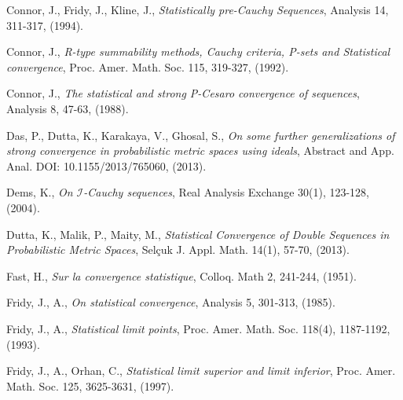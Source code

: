 \documentclass[reqno,b5paper]{amsart}
\theoremstyle{plain}
\theoremstyle{definition}
\begin{document}
\begin{thebibliography}{99}

 Connor, J., Fridy, J., Kline, J., \textit{Statistically pre-Cauchy Sequences}, Analysis 14, 311-317, (1994).

 Connor, J., \textit{R-type summability methods, Cauchy criteria, P-sets and Statistical
convergence}, Proc. Amer. Math. Soc. 115, 319-327, (1992).

 Connor, J., \textit{The statistical and strong P-Cesaro convergence of sequences}, Analysis 8, 47-63, (1988).


 Das, P., Dutta, K., Karakaya, V., Ghosal, S., \textit{On some further generalizations of strong convergence in probabilistic metric spaces using ideals}, Abstract and App. Anal. DOI: 10.1155/2013/765060, (2013).


 Dems, K., \textit{On $\mathcal{I}$-Cauchy sequences}, Real Analysis Exchange 30(1), 123-128, (2004).

 Dutta, K., Malik, P., Maity, M., \textit{Statistical Convergence of Double Sequences in Probabilistic Metric Spaces}, Sel\c{c}uk J. Appl. Math. 14(1), 57-70, (2013).


 Fast, H., \textit{Sur la convergence statistique}, Colloq. Math 2, 241-244, (1951).

 Fridy, J., A., \textit{On statistical convergence}, Analysis  5, 301-313, (1985).

 Fridy, J., A., \textit{Statistical limit points}, Proc. Amer. Math. Soc. 118(4), 1187-1192, (1993).

 Fridy, J., A., Orhan, C., \textit{Statistical limit superior and limit inferior}, Proc. Amer. Math. Soc. 125, 3625-3631, (1997).


\end{thebibliography}
\end{document}

